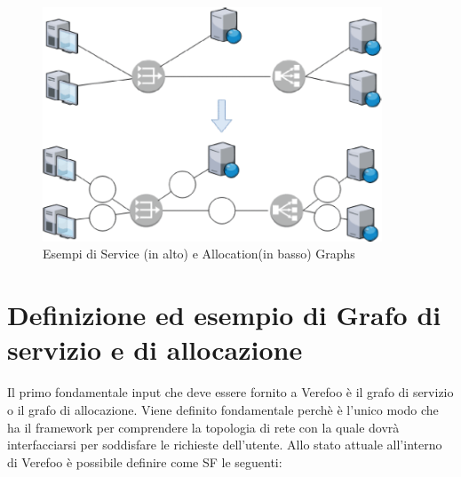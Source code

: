 \begin{figure}[h]  %
    \centering
    \includegraphics[width=0.9\textwidth]{Service_Allocation_Graph.png}  %
    \caption{Esempi di Service (in alto) e Allocation(in basso) Graphs \cite{Bringhenti2019}}
    \label{fig:AllocationGraph}
  \end{figure}



\section{Definizione ed esempio di Grafo di servizio e di allocazione}

Il primo fondamentale input che deve essere fornito a Verefoo è il grafo di servizio o il grafo di allocazione. 
Viene definito fondamentale perchè è l'unico modo che ha il framework per comprendere la topologia di rete con la quale dovrà interfacciarsi per soddisfare le richieste dell'utente.
Allo stato attuale all'interno di Verefoo è possibile definire come SF le seguenti:

